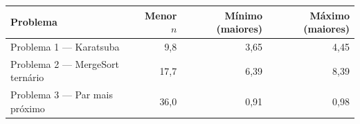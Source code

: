 \begin{tabular}{lrrr}
\toprule
Problema & Menor $n$ & Mínimo (maiores) & Máximo (maiores) \\
\midrule
Problema 1 --- Karatsuba & 9,8 & 3,65 & 4,45 \\
Problema 2 --- MergeSort ternário & 17,7 & 6,39 & 8,39 \\
Problema 3 --- Par mais próximo & 36,0 & 0,91 & 0,98 \\
\bottomrule
\end{tabular}
